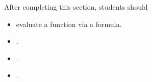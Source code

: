 \documentclass{ximera}
\begin{document}
\begin{sectionOutcomes}
After completing this section, students should 

\begin{itemize}
\item evaluate a function via a formula.
\item .
\item .
\item .
\end{itemize}
\end{sectionOutcomes}
\end{document}
